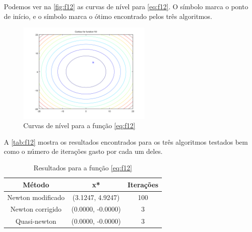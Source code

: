 \documentclass[12pt]{article}
\begin{document}
Podemos ver na \autoref{fig:f12} as curvas de nível para \autoref{eq:f12}. O símbolo \textit{\textopenbullet} marca o ponto de início,
e o símbolo \textit{\texttimes} marca o ótimo encontrado pelos três algoritmos.

\begin{figure}[H]
  \centering
  \includegraphics[width=250px]{../matlab/images/f12_contour}
  \caption{Curvas de nível para a função \autoref{eq:f12}}
  \label{fig:f12}
\end{figure}

A \autoref{tab:f12} mostra os resultados encontrados para os três algoritmos testados bem como o número de iterações gasto por cada um deles.

\begin{table}[H]
\centering
\begin{tabular}{*3c}
\toprule
Método			&	x*		&	Iterações\\
\midrule
Newton modificado	&	 (3.1247, 4.9247)	&	100\\
Newton corrigido	&	(0.0000, -0.0000)	&	3\\
Quasi-newton		&	(0.0000, -0.0000)	&	3\\
\bottomrule
\end{tabular}
\caption{\small{Resultados para a função \autoref{eq:f12} }}
\label{tab:f12}
\end{table}
\end{document}
